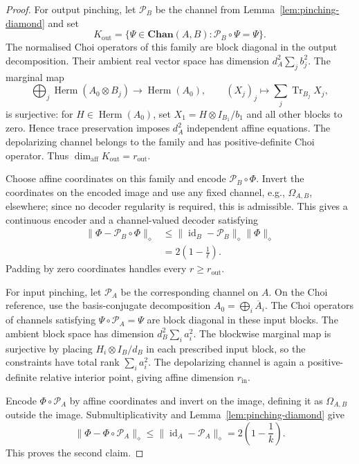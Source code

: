 \documentclass[11pt,a4paper]{article}
\theoremstyle{definition}
\theoremstyle{plain}
\theoremstyle{remark}
\DeclareMathOperator{\Tr}{Tr}
\DeclareMathOperator{\Herm}{Herm}
\newcommand{\Chan}{\mathbf{Chan}}
\begin{document}
\begin{proof}
For output pinching, let $\mathcal P_B$ be the channel from
Lemma~\ref{lem:pinching-diamond} and set
\[
K_{\mathrm{out}}
=\{\Psi\in\Chan(A,B):\mathcal P_B\circ\Psi=\Psi\}.
\]
The normalised Choi operators of this family are block diagonal in the
output decomposition. Their ambient real vector space has dimension
$d_A^2\sum_jb_j^2$. The marginal map
\[
\bigoplus_j\Herm(A_0\otimes B_j)\longrightarrow\Herm(A_0),
\qquad
(X_j)_j\longmapsto\sum_j\Tr_{B_j}X_j,
\]
is surjective: for $H\in\Herm(A_0)$, set
$X_1=H\otimes I_{B_1}/b_1$ and all other blocks to zero. Hence trace
preservation imposes $d_A^2$ independent affine equations. The depolarizing
channel belongs to the family and has
positive-definite Choi operator. Thus
$\dim_{\mathrm{aff}}K_{\mathrm{out}}=r_{\mathrm{out}}$.

Choose affine coordinates on this family and encode
$\mathcal P_B\circ\Phi$. Invert the coordinates on the encoded image and
use any fixed channel, e.g., $\Omega_{A,B}$, elsewhere; since no decoder
regularity is required, this is admissible. This gives a continuous encoder and a
channel-valued decoder satisfying
\begin{align*}
\|\Phi-\mathcal P_B\circ\Phi\|_\diamond
&\leq
\|\operatorname{id}_B-\mathcal P_B\|_\diamond
\|\Phi\|_\diamond\\
&=2\left(1-\frac1\ell\right).
\end{align*}
Padding by zero coordinates handles every $r\geq r_{\mathrm{out}}$.

For input pinching, let $\mathcal P_A$ be the corresponding channel on
$A$. On the Choi reference, use the basis-conjugate decomposition
$A_0=\bigoplus_i\overline A_i$. The Choi operators of channels satisfying
$\Psi\circ\mathcal P_A=\Psi$ are block diagonal in these input blocks. The
ambient block space has dimension $d_B^2\sum_i a_i^2$. The blockwise
marginal map is surjective by placing
$H_i\otimes I_B/d_B$ in each prescribed input block, so the constraints have
total rank $\sum_i a_i^2$. The depolarizing
channel is again a positive-definite relative interior point, giving affine
dimension $r_{\mathrm{in}}$.

Encode $\Phi\circ\mathcal P_A$ by affine coordinates and invert on the
image, defining it as $\Omega_{A,B}$ outside the image. Submultiplicativity and Lemma~\ref{lem:pinching-diamond} give
\[
\|\Phi-\Phi\circ\mathcal P_A\|_\diamond
\leq\|\operatorname{id}_A-\mathcal P_A\|_\diamond
=2\left(1-\frac1k\right).
\]
This proves the second claim.
\end{proof}
\end{document}
